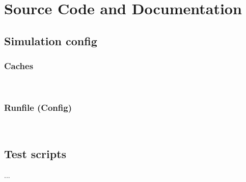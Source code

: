 \documentclass[12pt,twoside]{reedthesis}
\begin{document}
\chapter{Source Code and Documentation}

\section{Simulation config}

\subsection*{Caches}
%
\;\\

\subsection*{Runfile (Config)}
%
\;\\

\section{Test scripts}

...

\backmatter %

\nocite{*}
\printbibliography[title=References]
\end{document}
